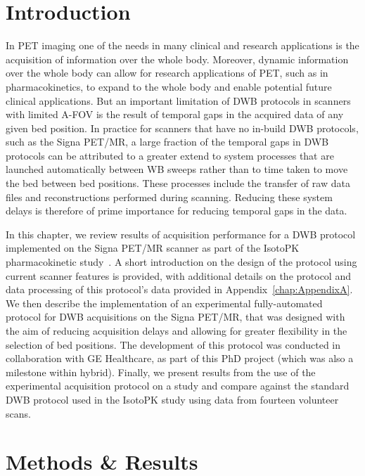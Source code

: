 \section{Introduction}
In PET imaging one of the needs in many clinical and research applications is the acquisition of information over the whole body. Moreover, dynamic information over the whole body can allow for research applications of PET, such as in pharmacokinetics, to expand to the whole body and enable potential future clinical applications. 
But an important limitation of DWB protocols in scanners with limited A-FOV is the result of temporal gaps in the acquired data of any given bed position.
In practice for scanners that have no in-build DWB protocols, such as the Signa PET/MR, a large fraction of the temporal gaps in DWB protocols can be attributed to a greater extend to system processes that are launched automatically between WB sweeps rather than to time taken to move the bed between bed positions. These processes include the transfer of raw data files and reconstructions performed during scanning. %
Reducing these system delays is therefore of prime importance for reducing temporal gaps in the data.

In this chapter, we review results of acquisition performance for a DWB protocol implemented on the Signa PET/MR scanner as part of the IsotoPK pharmacokinetic study~\cite{Marie2019}. A short introduction on the design of the protocol using current scanner features is provided, with additional details on the protocol and data processing of this protocol's data provided in Appendix~\ref{chap:AppendixA}.
We then describe the implementation of an experimental fully-automated protocol for DWB acquisitions on the Signa PET/MR, that was designed with the aim of reducing acquisition delays and allowing for greater flexibility in the selection of bed positions. The development of this protocol was conducted in collaboration with GE Healthcare, as part of this PhD project (which was also a milestone within \gls{hybrid}). 
Finally, we present results from the use of the experimental acquisition protocol on a  study and compare against the standard DWB protocol used in the IsotoPK study using data from fourteen volunteer scans.

\section{Methods \& Results}
